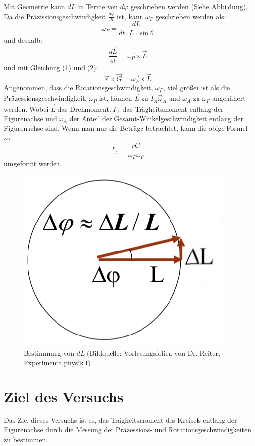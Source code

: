 \documentclass[11pt,a4paper]{article} %
\begin{document}
Mit Geometrie kann $dL$ in Terme von $d\varphi$ geschrieben werden (Siehe Abbildung). Da die Präzissionsgeschwindigkeit $\frac{d\varphi}{dt}$ ist, kann $\omega_P$ geschrieben werden als:
$$\omega_P = \frac{dL}{dt\cdot L\cdot \sin\theta}$$
und deshalb:
$$\frac{d\vec{L}}{dt} = \vec{\omega_P}\times \vec{L}$$
und mit Gleichung (1) und (2):
$$\vec{r}\times \vec{G} = \vec{\omega_P}\times \vec{L}$$
Angenommen, dass die Rotationsgeschwindigkeit, $\omega_F$, viel größer ist als die Präzessionsgeschwindigkeit, $\omega_P$ ist, können $\vec{L}$ zu $I_A\vec{\omega}_A$ und $\omega_A$ zu $\omega_F$ angenähert werden. Wobei $\vec{L}$ das Drehmoment, $I_A$ das Trägheitsmoment entlang der Figurenachse und $\omega_A$ der Anteil der Gesamt-Winkelgeschwindigkeit entlang der Figurenachse sind. Wenn man nur die Beträge betrachtet, kann die obige Formel zu 
\begin{equation}
I_A = \frac{rG}{\omega_F \omega_P}
\end{equation}
umgeformt werden.
\begin{figure}
	\centering
	\includegraphics[scale=0.5]{Abb0}
	\caption{Bestimmung von $dL$ (Bildquelle: Vorlesungsfolien von Dr. Reiter, Experimentalphysik I)}
\end{figure}

\section{Ziel des Versuchs}
Das Ziel dieses Versuchs ist es, das Trägheitsmoment des Kreisels entlang der Figurenachse durch die Messung der Präzessions- und Rotationsgeschwindigkeiten zu bestimmen.
\end{document}
